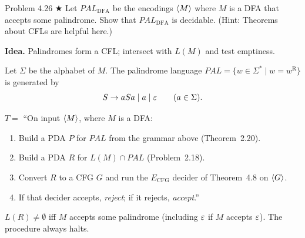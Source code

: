 \begin{question}{Problem 4.26 $\bigstar$}
Let $\mathit{PAL}_{\mathrm{DFA}}$ be the encodings $\langle M\rangle$ where $M$ is a DFA that accepts some palindrome. Show that $\mathit{PAL}_{\mathrm{DFA}}$ is decidable. (Hint: Theorems about CFLs are helpful here.)
\end{question}
\begin{soln}
\textbf{Idea.} Palindromes form a CFL; intersect with $L(M)$ and test emptiness.

Let $\Sigma$ be the alphabet of $M$. The palindrome language $\mathit{PAL}=\{w\in\Sigma^*\mid w=w^{\mathrm{R}}\}$ is generated by
\[
S\to aSa \mid a \mid \varepsilon \qquad(a\in\Sigma).
\]

$T=$ ``On input $\langle M\rangle$, where $M$ is a DFA:
\begin{enumerate}
\item Build a PDA $P$ for $\mathit{PAL}$ from the grammar above (Theorem~2.20).
\item Build a PDA $R$ for $L(M)\cap\mathit{PAL}$ (Problem~2.18).
\item Convert $R$ to a CFG $G$ and run the $E_{\mathrm{CFG}}$ decider of Theorem~4.8 on $\langle G\rangle$.
\item If that decider accepts, \emph{reject}; if it rejects, \emph{accept}.''
\end{enumerate}
$L(R)\neq\emptyset$ iff $M$ accepts some palindrome (including $\varepsilon$ if $M$ accepts $\varepsilon$). The procedure always halts.
\end{soln}

